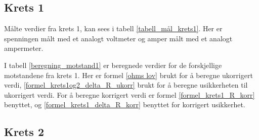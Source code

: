 \documentclass[twocolumn, a4paper, 11pt]{article} %
\begin{document}
\subsection{Krets 1}

Målte verdier fra krets 1, kan sees i tabell \ref{tabell_mål_krets1}. Her er spenningen målt med et analogt voltmeter og amper målt med et analogt ampermeter.

\begin{table}[H]
\centering
\caption{Krets 1.}
\label{tabell_mål_krets1}
\end{table}

I tabell \ref{beregning_motstand1} er beregnede verdier for de forskjellige motstandene fra krets 1. Her er formel \eqref{ohms lov} brukt for å beregne ukorrigert verdi, \eqref{formel_krets1og2_delta_R_ukorr} brukt for å beregne usikkerheten til  ukorrigert verdi. For å beregne korrigert verdi er formel \eqref{formel_krets1_R_korr} benyttet, og \eqref{formel_krets1_delta_R_korr} benyttet for korrigert usikkerhet.

\begin{table}[H]
\centering
\caption{Krets 1 motstand beregning.}
\label{beregning_motstand1}
\end{table}

\subsection{Krets 2}
\end{document}
